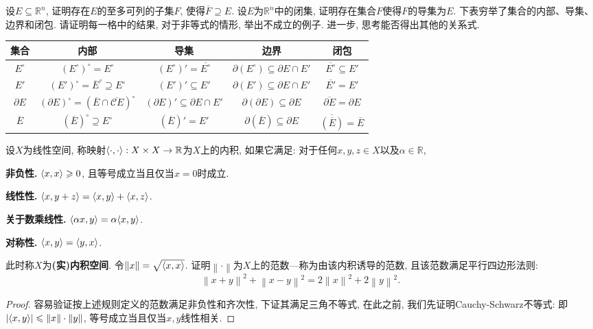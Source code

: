 \begin{quizb}
\woe 设\(E\subseteq \mathbb{R}^n\), 证明存在\(E\)的至多可列的子集\(F\), 使得\(\overline{F}\supseteq E\).
\woe 设\(E\)为\(\mathbb{R}^n\)中的闭集, 证明存在集合\(F\)使得\(F\)的导集为\(E\).
\woe 下表穷举了集合的内部、导集、边界和闭包. 请证明每一格中的结果, 对于非等式的情形, 举出不成立的例子. 进一步, 思考能否得出其他的关系式.
    \begin{table}[H]
      \centering
      \begin{tabular}{ccccc}
        \hline
        集合  &  内部  &  导集  &  边界  &  闭包\\\hline
        \(E^\circ\)  &  \((E^\circ)^\circ=E^\circ\)  &  \((E^\circ)'=\overline{E^\circ}\)  &  \(\partial(E^\circ)\subseteq\partial E\cap E'\)  &  \(\overline{E^\circ}\subseteq E'\)\\
        \(E'\)  &  \((E')^\circ=\overline{E}^\circ\supseteq E^\circ\)  &  \((E')'\subseteq E'\)  &  \(\partial (E')\subseteq \partial E\cap E'\)  &  \(\overline{E'}=E'\)\\
        \(\partial E\)  &  \((\partial E)^\circ=(\overline{E}\cap \overline{\mathscr{C}E})^\circ\)  &  \((\partial E)'\subseteq\partial E\cap E'\)  &  \(\partial(\partial E)\subseteq \partial E\)  &  \(\overline{\partial E}=\partial E\)\\
        \(\overline{E}\)  &  \((\overline{E})^\circ\supseteq E^\circ\)  &  \((\overline{E})'=E'\)  &  \(\partial(\overline{E})\subseteq \partial E\)  &  \(\overline{\left(\overline{E}\right)}=\overline{E}\)\\\hline
      \end{tabular}
    \end{table}
\woe 设\(X\)为线性空间, 称映射\(\langle \cdot,\cdot \rangle:X\times X\rightarrow \mathbb{R}\)为\(X\)上的内积, 如果它满足: 对于任何\(x,y,z\in X\)以及\(\alpha\in \mathbb{R}\),
\begin{compactenum}[(1)]
    \item \textbf{非负性.} \(\langle x,x \rangle\geqslant 0\), 且等号成立当且仅当\(x=0\)时成立.
    \item \textbf{线性性.} \(\langle x,y+z \rangle=\langle x,y \rangle+\langle x,z \rangle\).
    \item \textbf{关于数乘线性.} \(\langle \alpha x,y \rangle=\alpha\langle x,y \rangle\).
    \item \textbf{对称性.} \(\langle x,y \rangle=\langle y,x \rangle\).
\end{compactenum}
此时称\(X\)为\textbf{(实)内积空间}. 令\(\left\|x\right\|=\sqrt{\langle x,x \rangle}\). 证明\(\left\|\cdot\right\|\)为\(X\)上的范数---称为由该内积诱导的范数, 且该范数满足平行四边形法则:\[\left\|x+y\right\|^2+\left\|x-y\right\|^2=2\left\|x\right\|^2+2\left\|y\right\|^2.\]
\begin{proof}
容易验证按上述规则定义的范数满足非负性和齐次性, 下证其满足三角不等式, 在此之前, 我们先证明Cauchy-Schwarz不等式: 即\(\left|\langle x,y \rangle\right|\leqslant\left\|x\right\|\cdot\left\|y\right\|\), 等号成立当且仅当\(x,y\)线性相关.


\end{proof}
\end{quizb}
